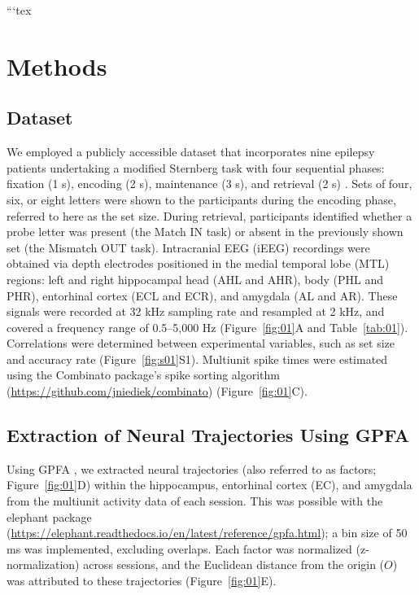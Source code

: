 ```tex
\section{Methods}
\subsection{Dataset}
We employed a publicly accessible dataset \cite{boran_dataset_2020} that incorporates nine epilepsy patients undertaking a modified Sternberg task with four sequential phases: fixation (1 s), encoding (2 s), maintenance (3 s), and retrieval (2 s) \cite{boran_dataset_2020}. Sets of four, six, or eight letters were shown to the participants during the encoding phase, referred to here as the set size. During retrieval, participants identified whether a probe letter was present (the Match IN task) or absent in the previously shown set (the Mismatch OUT task). Intracranial EEG (iEEG) recordings were obtained via depth electrodes positioned in the medial temporal lobe (MTL) regions: left and right hippocampal head (AHL and AHR), body (PHL and PHR), entorhinal cortex (ECL and ECR), and amygdala (AL and AR). These signals were recorded at 32 kHz sampling rate and resampled at 2 kHz, and covered a frequency range of 0.5--5,000 Hz (Figure~\ref{fig:01}A and Table~\ref{tab:01}). Correlations were determined between experimental variables, such as set size and accuracy rate (Figure~\ref{fig:s01}S1). Multiunit spike times were estimated using the Combinato package's spike sorting algorithm \cite{niediek_reliable_2016} (\url{https://github.com/jniediek/combinato}) (Figure~\ref{fig:01}C).

\subsection{Extraction of Neural Trajectories Using GPFA}
Using GPFA \cite{yu_gaussian-process_2009}, we extracted neural trajectories (also referred to as factors; Figure~\ref{fig:01}D) within the hippocampus, entorhinal cortex (EC), and amygdala from the multiunit activity data of each session. This was possible with the elephant package (\url{https://elephant.readthedocs.io/en/latest/reference/gpfa.html}); a bin size of 50 ms was implemented, excluding overlaps. Each factor was normalized (z-normalization) across sessions, and the Euclidean distance from the origin ($O$) was attributed to these trajectories (Figure~\ref{fig:01}E).

